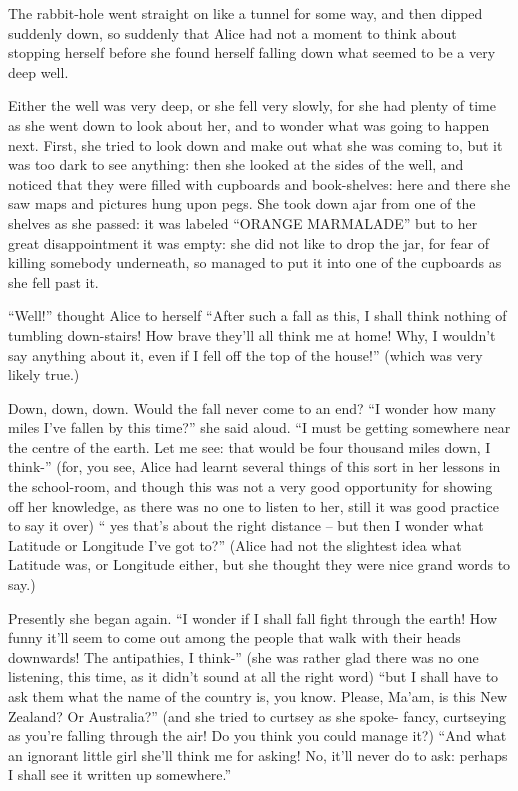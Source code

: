 \documentclass{l3proj}
\begin{document}
The rabbit-hole went straight on like a tunnel for some way, and then
dipped suddenly down, so suddenly that Alice had not a moment to think
about stopping herself before she found herself falling down what seemed to
be a very deep well.

Either the well was very deep, or she fell very slowly, for she had plenty
of time as she went down to look about her, and to wonder what was going to
happen next. First, she tried to look down and make out what she was coming
to, but it was too dark to see anything: then she looked at the sides of
the well, and noticed that they were filled with cupboards and
book-shelves: here and there she saw maps and pictures hung upon pegs. She
took down ajar from one of the shelves as she passed: it was labeled
``ORANGE MARMALADE'' but to her great disappointment it was empty: she did
not like to drop the jar, for fear of killing somebody underneath, so
managed to put it into one of the cupboards as she fell past it.

``Well!'' thought Alice to herself ``After such a fall as this, I shall think
nothing of tumbling down-stairs! How brave they'll all think me at home!
Why, I wouldn't say anything about it, even if I fell off the top of the
house!'' (which was very likely true.)

Down, down, down. Would the fall never come to an end? ``I wonder how many
miles I've fallen by this time?'' she said aloud. ``I must be getting
somewhere near the centre of the earth. Let me see: that would be four
thousand miles down, I think-'' (for, you see, Alice had learnt several
things of this sort in her lessons in the school-room, and though this was
not a very good opportunity for showing off her knowledge, as there was no
one to listen to her, still it was good practice to say it over) `` yes
that's about the right distance -- but then I wonder what Latitude or
Longitude I've got to?'' (Alice had not the slightest idea what Latitude
was, or Longitude either, but she thought they were nice grand words to
say.)

Presently she began again. ``I wonder if I shall fall fight through the
earth! How funny it'll seem to come out among the people that walk with
their heads downwards! The antipathies, I think-'' (she was rather glad
there was no one listening, this time, as it didn't sound at all the right
word) ``but I shall have to ask them what the name of the country is, you
know. Please, Ma'am, is this New Zealand? Or Australia?'' (and she tried to
curtsey as she spoke- fancy, curtseying as you're falling through the air!
Do you think you could manage it?) ``And what an ignorant little girl she'll
think me for asking! No, it'll never do to ask: perhaps I shall see it
written up somewhere.''
\end{document}
